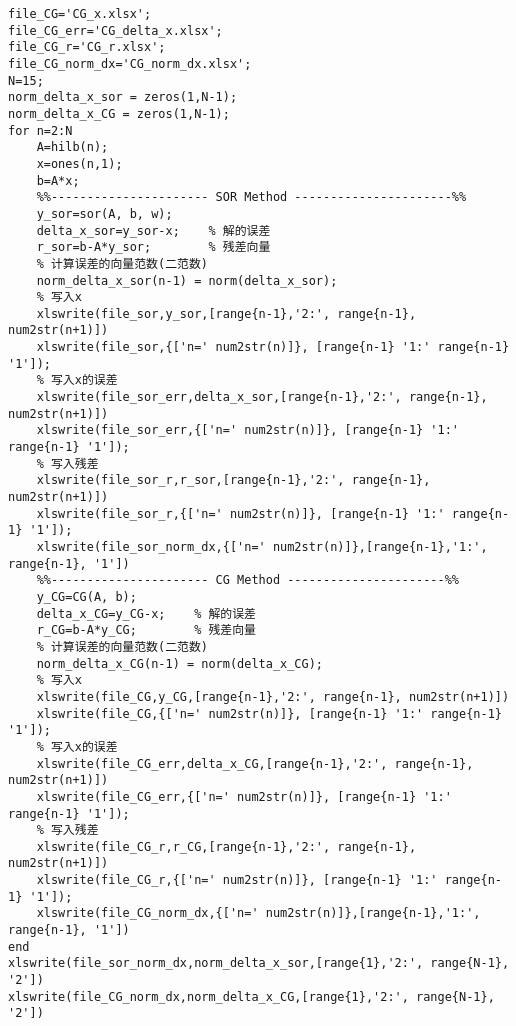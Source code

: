 \documentclass[a4paper]{article}
\begin{document}
\begin{CJK*}{GBK}{song}
\begin{enumerate}[(1)]
\begin{lstlisting}
file_CG='CG_x.xlsx';
file_CG_err='CG_delta_x.xlsx';
file_CG_r='CG_r.xlsx';
file_CG_norm_dx='CG_norm_dx.xlsx';
N=15;
norm_delta_x_sor = zeros(1,N-1);
norm_delta_x_CG = zeros(1,N-1);
for n=2:N
    A=hilb(n);
    x=ones(n,1);
    b=A*x;
    %%---------------------- SOR Method ----------------------%%
    y_sor=sor(A, b, w);
    delta_x_sor=y_sor-x;    % 解的误差
    r_sor=b-A*y_sor;        % 残差向量
    % 计算误差的向量范数(二范数)
    norm_delta_x_sor(n-1) = norm(delta_x_sor);
    % 写入x
    xlswrite(file_sor,y_sor,[range{n-1},'2:', range{n-1}, num2str(n+1)])
    xlswrite(file_sor,{['n=' num2str(n)]}, [range{n-1} '1:' range{n-1} '1']);
    % 写入x的误差
    xlswrite(file_sor_err,delta_x_sor,[range{n-1},'2:', range{n-1}, num2str(n+1)])
    xlswrite(file_sor_err,{['n=' num2str(n)]}, [range{n-1} '1:' range{n-1} '1']);
    % 写入残差
    xlswrite(file_sor_r,r_sor,[range{n-1},'2:', range{n-1}, num2str(n+1)])
    xlswrite(file_sor_r,{['n=' num2str(n)]}, [range{n-1} '1:' range{n-1} '1']);
    xlswrite(file_sor_norm_dx,{['n=' num2str(n)]},[range{n-1},'1:', range{n-1}, '1'])
    %%---------------------- CG Method ----------------------%%
    y_CG=CG(A, b);
    delta_x_CG=y_CG-x;    % 解的误差
    r_CG=b-A*y_CG;        % 残差向量
    % 计算误差的向量范数(二范数)
    norm_delta_x_CG(n-1) = norm(delta_x_CG);
    % 写入x
    xlswrite(file_CG,y_CG,[range{n-1},'2:', range{n-1}, num2str(n+1)])
    xlswrite(file_CG,{['n=' num2str(n)]}, [range{n-1} '1:' range{n-1} '1']);
    % 写入x的误差
    xlswrite(file_CG_err,delta_x_CG,[range{n-1},'2:', range{n-1}, num2str(n+1)])
    xlswrite(file_CG_err,{['n=' num2str(n)]}, [range{n-1} '1:' range{n-1} '1']);
    % 写入残差
    xlswrite(file_CG_r,r_CG,[range{n-1},'2:', range{n-1}, num2str(n+1)])
    xlswrite(file_CG_r,{['n=' num2str(n)]}, [range{n-1} '1:' range{n-1} '1']);
    xlswrite(file_CG_norm_dx,{['n=' num2str(n)]},[range{n-1},'1:', range{n-1}, '1'])
end
xlswrite(file_sor_norm_dx,norm_delta_x_sor,[range{1},'2:', range{N-1}, '2'])
xlswrite(file_CG_norm_dx,norm_delta_x_CG,[range{1},'2:', range{N-1}, '2'])
\end{lstlisting}
\end{enumerate}




\end{CJK*}
\end{document}
